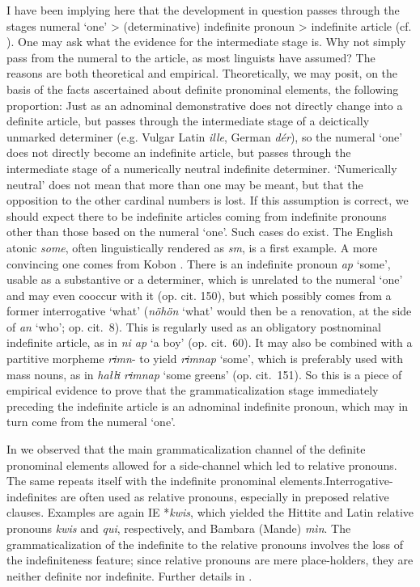 I have been implying here that the development in question passes through the stages numeral ‘one’ {\textgreater} (determinative) indefinite pronoun {\textgreater} indefinite article (cf. \citealt[273]{HeineEtAl1984}). One may ask what the evidence for the intermediate stage is. Why not simply pass from the numeral to the article, as most linguists have assumed? The reasons are both theoretical and empirical. Theoretically, we may posit, on the basis of the facts ascertained about definite pronominal elements, the following proportion: Just as an adnominal demonstrative does not directly change into a definite article, but passes through the intermediate stage of a deictically unmarked determiner (e.g. Vulgar Latin \textit{ille}, German \textit{dér}), so the numeral ‘one’ does not directly become an indefinite article, but passes through the intermediate stage of a numerically neutral indefinite determiner. ‘Numerically neutral’ does not mean that more than one may be meant, but that the opposition to the other cardinal numbers is lost. If this assumption is correct, we should expect there to be indefinite articles coming from indefinite pronouns other than those based on the numeral ‘one’. Such cases do exist. The English atonic \textit{some}, often linguistically rendered as \textit{sm}, is a first example. A more convincing one comes from Kobon \citep{Davies1981}. There is an indefinite pronoun \textit{ap} ‘some’, usable as a substantive or a determiner, which is unrelated to the numeral ‘one’ and may even cooccur with it (op. cit. 150), but which possibly comes from a former interrogative ‘what’ (\textit{nöhön} ‘what’ would then be a renovation, at the side of \textit{an} ‘who’; op. cit.~8). This is regularly used as an obligatory postnominal indefinite article, as in \textit{ni ap} ‘a boy’ (op. cit.~60). It may also be combined with a partitive morpheme \textit{r\st{i}mn}{}- to yield \textit{r\st{i}mnap} ‘some’, which is preferably used with mass nouns, as in \textit{hałl\st{i} r\st{i}mnap} ‘some greens’ (op. cit.~151). So this is a piece of empirical evidence to prove that the grammaticalization stage immediately preceding the indefinite article is an adnominal indefinite pronoun, which may in turn come from the numeral ‘one’.

In  we observed that the main grammaticalization channel of the definite pronominal elements allowed for a side-channel which led to relative pronouns. The same repeats itself with the indefinite pronominal elements.\linebreak Interrogative-indefinites are often used as relative pronouns, especially in preposed relative clauses. Examples are again IE *\textit{kwis}, which yielded the Hittite and Latin relative pronouns \textit{kwis} and \textit{qui}, respectively, and Bambara (Mande) \textit{mìn}. The grammaticalization of the indefinite to the relative pronouns involves the loss of the indefiniteness feature; since relative pronouns are mere place-holders, they are neither definite nor indefinite. Further details in \citet[Ch.~V.2.3, §2]{Lehmann1984}.

